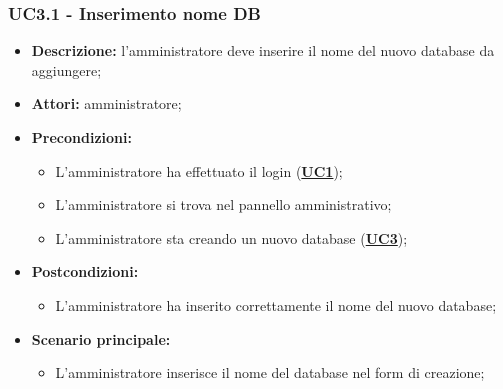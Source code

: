 \documentclass[5pt]{article}
\begin{document}
\subsubsection{UC3.1 - Inserimento nome DB}
\label{sec:UC3.1}
\begin{itemize}
	\item \textbf{Descrizione:} l’amministratore deve inserire il nome del nuovo database da aggiungere;
	\item \textbf{Attori:} amministratore;
	\item \textbf{Precondizioni:} 
	\begin{itemize}
		\item L’amministratore ha effettuato il login (\hyperref[sec:UC1]{\textbf{UC1}});
		\item L’amministratore si trova nel pannello amministrativo;
		\item L’amministratore sta creando un nuovo database (\hyperref[sec:UC3]{\textbf{UC3}});
	\end{itemize}
	\item \textbf{Postcondizioni:} 
	\begin{itemize}
		\item L'amministratore ha inserito correttamente il nome del nuovo database;
	\end{itemize}
	\item \textbf{Scenario principale:} 
	\begin{itemize}
		\item L’amministratore inserisce il nome del database nel form di creazione;
	\end{itemize}
\end{itemize}
\end{document}
